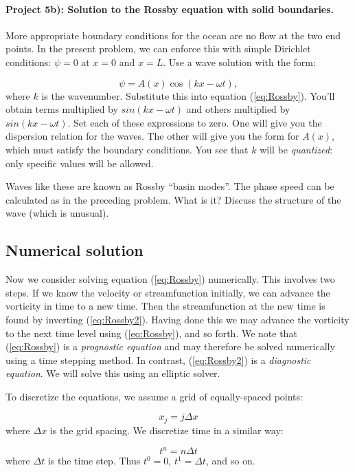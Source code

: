 \documentclass[%
oneside,                 %
final,                   %
10pt]{article}
\begin{document}
\paragraph{Project 5b): Solution to the Rossby equation with solid boundaries.}
More appropriate boundary conditions for the ocean are no flow at the
two end points. In the present problem, we can enforce this with
simple Dirichlet conditions: $\psi=0$ at $x=0$ and $x=L$. Use
a wave solution with the form:

\begin{equation}
	\psi = A(x)\cos(kx - \omega t), 
\end{equation}
where $k$ is the wavenumber. Substitute this into equation
(\ref{eq:Rossby}). You'll obtain terms multiplied by $sin(kx - \omega
t)$ and others multiplied by $sin(kx - \omega t)$. Set each of these
expressions to zero. One will give you the dispersion relation for the
waves. The other will give you the form for $A(x)$, which must satisfy
the boundary conditions. You see that $k$ will be \emph{quantized}:
only specific values will be allowed.

Waves like these are known as Rossby ``basin modes''. The phase speed
can be calculated as in the preceding problem. What is it? Discuss the
structure of the wave (which is unusual).


\subsection*{Numerical solution}
Now we consider solving equation (\ref{eq:Rossby}) numerically. This
involves two steps. If we know the velocity or streamfunction
initially, we can advance the vorticity in time to a new time. Then
the streamfunction at the new time is found by inverting
(\ref{eq:Rossby2}). Having done this we may advance the vorticity to
the next time level using (\ref{eq:Rossby}), and so forth. We note
that (\ref{eq:Rossby}) is a \emph{prognostic equation} and may
therefore be solved numerically using a time stepping method. In
contrast, (\ref{eq:Rossby2}) is a \emph{diagnostic equation}. We will
solve this using an elliptic solver.

To discretize the equations, we assume a grid of equally-spaced
points:

\begin{equation}
x_j = j\Delta x
\end{equation}
where $\Delta x$ is the grid spacing. We discretize time in a similar way:

\begin{equation}
t^n = n\Delta t
\end{equation}
where $\Delta t$ is the time step. Thus $t^0=0$, $t^1=\Delta t$, and so on.
\end{document}
